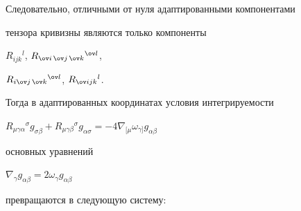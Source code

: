 Следовательно, отличными от нуля адаптированными компонентами 


тензора кривизны являются только компоненты 


$R_{i j k}{}^l$, $R_{\ov i\,\ov j\,\ov k}{}^{\ov l}$, 


$R_{i\ov j\,\ov k}{}^{\ov l}$, $R_{\ov i j k}{}^l$. 


Тогда в адаптированных координатах условия интегрируемости 


$R_{\mu\gamma\alpha}{}^\sigma g_{\sigma\beta}+ 


R_{\mu\gamma\beta}{}^\sigma g_{\alpha\sigma}= 


-4\nabla_{[\mu}\omega_{\gamma]}g_{\alpha\beta}$ 


основных уравнений 


$\nabla_\gamma g_{\alpha\beta}=2\omega_\gamma g_{\alpha\beta}$ 


превращаются в следующую систему: 


